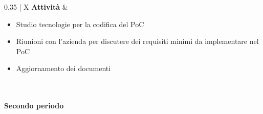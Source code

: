 \begin{xltabular}{\textwidth}{{0.35\textwidth} | X}
    \textbf{Attività} 
    & \begin{itemize}[topsep=0pt]
        \item Studio tecnologie per la codifica del PoC 
        \item Riunioni con l'azienda per discutere dei requisiti minimi da implementare nel PoC
        \item Aggiornamento dei documenti
    \end{itemize} \\
    \hline

\caption{Tabella descrittiva del periodo 1 della fase di progettazione e codifica del PoC}\label{tab:periodo2_1}
\end{xltabular}

\paragraph{Secondo periodo}\label{sec:pianificazione:progRTB:periodi:secondo}
